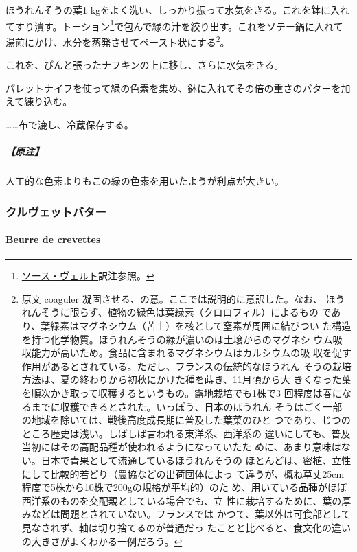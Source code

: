 \begin{recette}
ほうれんそうの葉1
kgをよく洗い、しっかり振って水気をきる。これを鉢に入れてすり潰す。トーション\footnote{\protect\hyperlink{sauce-verte}{ソース・ヴェルト}訳注参照。}で包んで緑の汁を絞り出す。これをソテー鍋に入れて湯煎にかけ、水分を蒸発させてペースト状にする\footnote{原文
  coaguler 凝固させる、の意。ここでは説明的に意訳した。なお、
  ほうれんそうに限らず、植物の緑色は葉緑素（クロロフィル）によるもの
  であり、葉緑素はマグネシウム（苦土）を核として窒素が周囲に結びつい
  た構造を持つ化学物質。ほうれんそうの緑が濃いのは土壌からのマグネシ
  ウム吸収能力が高いため。食品に含まれるマグネシウムはカルシウムの吸
  収を促す作用があるとされている。ただし、フランスの伝統的なほうれん
  そうの栽培方法は、夏の終わりから初秋にかけた種を蒔き、11月頃から大
  きくなった葉を順次かき取って収穫するというもの。露地栽培でも1株で3
  回程度は春になるまでに収穫できるとされた。いっぽう、日本のほうれん
  そうはごく一部の地域を除いては、戦後高度成長期に普及した葉菜のひと
  つであり、じつのところ歴史は浅い。しばしば言われる東洋系、西洋系の
  違いにしても、普及当初にはその高配品種が使われるようになっていたた
  めに、あまり意味はない。日本で青果として流通しているほうれんそうの
  ほとんどは、密植、立性にして比較的若どり（農協などの出荷団体によっ
  て違うが、概ね草丈25cm程度で5株から10株で200gの規格が平均的）のた
  め、用いている品種がほぼ西洋系のものを交配親としている場合でも、立
  性に栽培するために、葉の厚みなどは問題とされていない。フランスでは
  かつて、葉以外は可食部として見なされず、軸は切り捨てるのが普通だっ
  たことと比べると、食文化の違いの大きさがよくわかる一例だろう。}。

これを、ぴんと張ったナフキンの上に移し、さらに水気をきる。

パレットナイフを使って緑の色素を集め、鉢に入れてその倍の重さのバターを加えて練り込む。

\ldots{}\ldots{}布で漉し、冷蔵保存する。

\hypertarget{ux539fux6ce8-1}{%
\subparagraph{【原注】}\label{ux539fux6ce8-1}}

人工的な色素よりもこの緑の色素を用いたようが利点が大きい。

\maeaki

\hypertarget{ux30afux30ebux30f4ux30a7ux30c3ux30c8ux30d0ux30bfux30fc}{%
\subsubsection{クルヴェットバター}\label{ux30afux30ebux30f4ux30a7ux30c3ux30c8ux30d0ux30bfux30fc}}

\hypertarget{beurre-de-crevettes}{%
\paragraph{Beurre de crevettes}\label{beurre-de-crevettes}}


\end{recette}
